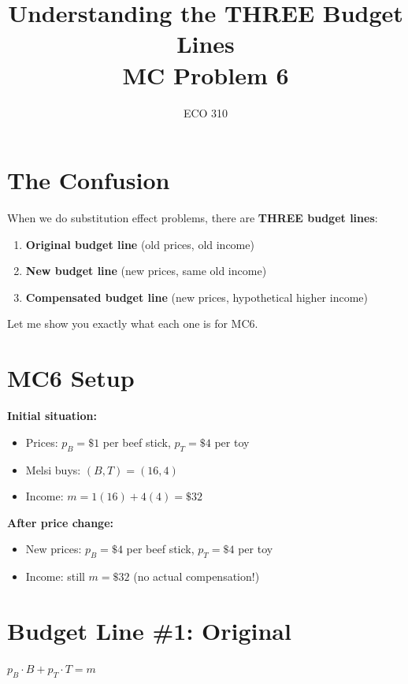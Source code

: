 \documentclass[12pt]{article}
\title{\LARGE Understanding the THREE Budget Lines\\MC Problem 6}
\author{ECO 310}
\date{}
\begin{document}
\maketitle

\section*{The Confusion}

When we do substitution effect problems, there are \textbf{THREE budget lines}:
\begin{enumerate}
    \item \textbf{Original budget line} (old prices, old income)
    \item \textbf{New budget line} (new prices, same old income)
    \item \textbf{Compensated budget line} (new prices, hypothetical higher income)
\end{enumerate}

Let me show you exactly what each one is for MC6.

\section*{MC6 Setup}

\textbf{Initial situation:}
\begin{itemize}
    \item Prices: $p_B = \$1$ per beef stick, $p_T = \$4$ per toy
    \item Melsi buys: $(B, T) = (16, 4)$
    \item Income: $m = 1(16) + 4(4) = \$32$
\end{itemize}

\textbf{After price change:}
\begin{itemize}
    \item New prices: $p_B = \$4$ per beef stick, $p_T = \$4$ per toy
    \item Income: still $m = \$32$ (no actual compensation!)
\end{itemize}

\section*{Budget Line \#1: Original}

\begin{center}
\colorbox{blue!20}{
\Large
$p_B \cdot B + p_T \cdot T = m$
}
\end{center}
\end{document}
